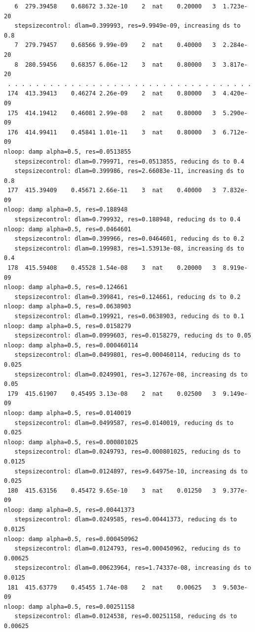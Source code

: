 \documentclass[a4paper,12pt]{article}
\begin{document}
\begin{verbatim}
   6  279.39458    0.68672 3.32e-10    2  nat    0.20000   3  1.723e-20 
   stepsizecontrol: dlam=0.399993, res=9.9949e-09, increasing ds to 0.8
   7  279.79457    0.68566 9.99e-09    2  nat    0.40000   3  2.284e-20 
   8  280.59456    0.68357 6.06e-12    3  nat    0.80000   3  3.817e-20 
 . . . . . . . . . . . . . . . . . . . . . . . . . . . . . . . . . . . 
 174  413.39413    0.46274 2.26e-09    2  nat    0.80000   3  4.420e-09 
 175  414.19412    0.46081 2.99e-08    2  nat    0.80000   3  5.290e-09 
 176  414.99411    0.45841 1.01e-11    3  nat    0.80000   3  6.712e-09 
nloop: damp alpha=0.5, res=0.0513855
   stepsizecontrol: dlam=0.799971, res=0.0513855, reducing ds to 0.4
   stepsizecontrol: dlam=0.399986, res=2.66083e-11, increasing ds to 0.8
 177  415.39409    0.45671 2.66e-11    3  nat    0.40000   3  7.832e-09 
nloop: damp alpha=0.5, res=0.188948
   stepsizecontrol: dlam=0.799932, res=0.188948, reducing ds to 0.4
nloop: damp alpha=0.5, res=0.0464601
   stepsizecontrol: dlam=0.399966, res=0.0464601, reducing ds to 0.2
   stepsizecontrol: dlam=0.199983, res=1.53913e-08, increasing ds to 0.4
 178  415.59408    0.45528 1.54e-08    3  nat    0.20000   3  8.919e-09 
nloop: damp alpha=0.5, res=0.124661
   stepsizecontrol: dlam=0.399841, res=0.124661, reducing ds to 0.2
nloop: damp alpha=0.5, res=0.0638903
   stepsizecontrol: dlam=0.199921, res=0.0638903, reducing ds to 0.1
nloop: damp alpha=0.5, res=0.0158279
   stepsizecontrol: dlam=0.0999603, res=0.0158279, reducing ds to 0.05
nloop: damp alpha=0.5, res=0.000460114
   stepsizecontrol: dlam=0.0499801, res=0.000460114, reducing ds to 0.025
   stepsizecontrol: dlam=0.0249901, res=3.12767e-08, increasing ds to 0.05
 179  415.61907    0.45495 3.13e-08    2  nat    0.02500   3  9.149e-09 
nloop: damp alpha=0.5, res=0.0140019
   stepsizecontrol: dlam=0.0499587, res=0.0140019, reducing ds to 0.025
nloop: damp alpha=0.5, res=0.000801025
   stepsizecontrol: dlam=0.0249793, res=0.000801025, reducing ds to 0.0125
   stepsizecontrol: dlam=0.0124897, res=9.64975e-10, increasing ds to 0.025
 180  415.63156    0.45472 9.65e-10    3  nat    0.01250   3  9.377e-09 
nloop: damp alpha=0.5, res=0.00441373
   stepsizecontrol: dlam=0.0249585, res=0.00441373, reducing ds to 0.0125
nloop: damp alpha=0.5, res=0.000450962
   stepsizecontrol: dlam=0.0124793, res=0.000450962, reducing ds to 0.00625
   stepsizecontrol: dlam=0.00623964, res=1.74337e-08, increasing ds to 0.0125
 181  415.63779    0.45455 1.74e-08    2  nat    0.00625   3  9.503e-09 
nloop: damp alpha=0.5, res=0.00251158
   stepsizecontrol: dlam=0.0124538, res=0.00251158, reducing ds to 0.00625

\end{verbatim}
\end{document}
